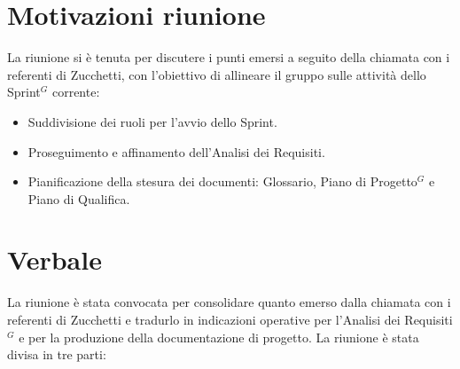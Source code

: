 \documentclass[a4paper,10pt]{article}
\begin{document}
\section*{Motivazioni riunione}
La riunione si è tenuta per discutere i punti emersi a seguito della chiamata con i referenti di Zucchetti, con l'obiettivo di allineare il gruppo sulle attività dello Sprint$^G$ corrente:
\begin{itemize}
    \item Suddivisione dei ruoli per l'avvio dello Sprint.
    \item Proseguimento e affinamento dell'Analisi dei Requisiti.
    \item Pianificazione della stesura dei documenti: Glossario, Piano di Progetto$^G$ e Piano di Qualifica.
\end{itemize}

\newpage

\section*{Verbale}
La riunione è stata convocata per consolidare quanto emerso dalla chiamata con i referenti di Zucchetti e tradurlo in indicazioni operative per l'Analisi dei Requisiti$^G$ e per la produzione della documentazione di progetto. La riunione è stata divisa in tre parti:
\end{document}
